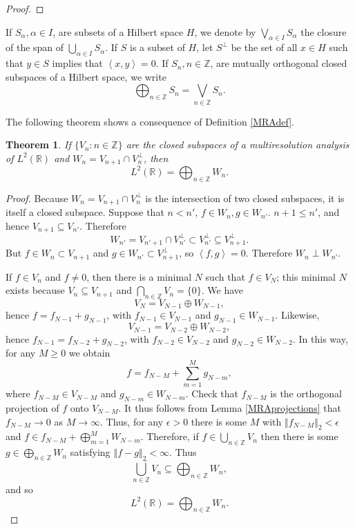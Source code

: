 \documentclass{article}
\newcommand{\inner}[2]{\left\langle #1, #2 \right\rangle}
\newcommand{\norm}[1]{\left\Vert #1 \right\Vert}
\newtheorem{theorem}{Theorem}
\theoremstyle{definition}
\begin{document}
\begin{proof}
\end{proof}

If $S_\alpha, \alpha \in I$, are subsets of a Hilbert space $H$, we denote by 
$\bigvee_{\alpha \in I} S_\alpha$ the closure of the span of $\bigcup_{\alpha \in I} S_\alpha$. If $S$ is a subset of $H$, let $S^\perp$ be the set
of all $x \in H$ such that $y \in S$ implies that $\inner{x}{y}=0$. If $S_n, n \in \mathbb{Z}$, are mutually orthogonal closed subspaces of a Hilbert space, we write
\[
\bigoplus_{n \in \mathbb{Z}} S_n = \bigvee_{n \in \mathbb{Z}} S_n.
\]

The following theorem shows a consequence of Definition \ref{MRAdef}.

\begin{theorem}
If $\{V_n: n \in \mathbb{Z}\}$ are the closed subspaces of a multiresolution analysis of $L^2(\mathbb{R})$ and $W_n=V_{n+1} \cap V_n^\perp$, then
\[
L^2(\mathbb{R}) = \bigoplus_{n \in \mathbb{Z}} W_n.
\]
\end{theorem}
\begin{proof}
Because $W_n=V_{n+1} \cap V_n^\perp$ is the intersection of two closed subspaces, it is itself a closed subspace. 
Suppose that $n < n'$, $f \in W_n, g \in W_{n'}$.  $n+1 \leq n'$, and hence $V_{n+1} \subseteq V_{n'}$. Therefore
\[
W_{n'} = V_{n'+1} \cap V_{n'}^\perp \subset V_{n'}^\perp \subseteq V_{n+1}^\perp.
\]
But $f \in W_n \subset V_{n+1}$ and $g \in W_{n'} \subset V_{n+1}^\perp$, so $\inner{f}{g}=0$. Therefore $W_n \perp W_{n'}$.


If $f \in V_n$ and $f \neq 0$, then there is a minimal $N$ such that $f \in V_N$; this minimal $N$ exists because $V_n \subseteq V_{n+1}$ and $\bigcap_{n \in \mathbb{Z}} V_n=
\{0\}$. We have
\[
V_N = V_{N-1} \oplus W_{N-1},
\]
hence $f=f_{N-1} + g_{N-1}$, with $f_{N-1} \in V_{N-1}$ and $g_{N-1} \in W_{N-1}$. Likewise,
\[
V_{N-1} = V_{N-2} \oplus W_{N-2},
\]
hence $f_{N-1} = f_{N-2}+g_{N-2}$, with $f_{N-2} \in V_{N-2}$ and $g_{N-2} \in W_{N-2}$. In this way, for any $M \geq 0$ we obtain
\[
f =f_{N-M}+ \sum_{m=1}^M g_{N-m},
\]
where $f_{N-M} \in V_{N-M}$ and $g_{N-m} \in W_{N-m}$. Check that $f_{N-M}$ is the orthogonal projection of $f$ onto $V_{N-M}$. It thus
 follows from Lemma \ref{MRAprojections} that $f_{N-M} \to 0$ as $M \to \infty$. Thus, for any $\epsilon>0$ there is some $M$ with
$\norm{f_{N-M}}_2<\epsilon$ and $f \in f_{N-M} + \bigoplus_{m=1}^M W_{N-m}$. Therefore, if $f \in \bigcup_{n \in \mathbb{Z}} V_n$ then
there is some $g \in \bigoplus_{n \in \mathbb{Z}} W_n$
satisfying $\norm{f-g}_2 < \infty$. Thus
\[
\overline{\bigcup_{n \in \mathbb{Z}} V_n} \subseteq \bigoplus_{n \in \mathbb{Z}} W_n,
\]
and so
\[
L^2(\mathbb{R}) = \bigoplus_{n \in \mathbb{Z}} W_n.
\]
\end{proof}
\end{document}
